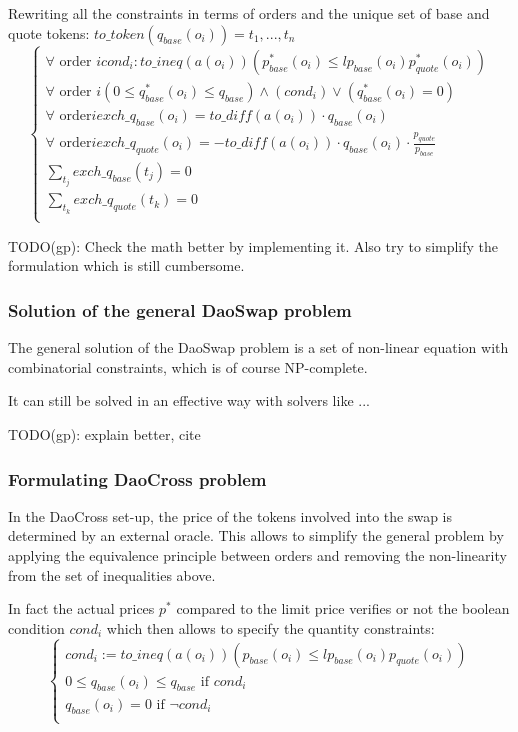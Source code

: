 \documentclass[11pt, reqno]{amsart}
\begin{document}
Rewriting all the constraints in terms of orders and the unique set of base and quote tokens:
$\mathit{to\_token}(q_{base}(o_i)) = t_1, ..., t_n$
\begin{equation}
  \begin{cases}
    \forall \text{ order } i cond_i: \mathit{to\_ineq}(a(o_i))(p^*_{base}(o_i) \leq lp_{base}(o_i) p^*_{quote}(o_i)) \\
    \forall \text{ order } i (0 \le q^*_{base}(o_i) \le q_{base}) \land (cond_i) \lor (q^*_{base}(o_i) = 0) \\
    \forall \text{ order} i exch\_q_{base}(o_i) = \mathit{to\_diff}(a(o_i)) \cdot q_{base}(o_i) \\
    \forall \text{ order} i exch\_q_{quote}(o_i) = - \mathit{to\_diff}(a(o_i)) \cdot q_{base}(o_i) \cdot \frac{p_{quote}}{p_{base}} \\
    \sum_{t_j} exch\_q_{base}(t_j) = 0 \\
    \sum_{t_k} exch\_q_{quote}(t_k) = 0 \\
  \end{cases}
\end{equation}

TODO(gp): Check the math better by implementing it. Also try to simplify the
formulation which is still cumbersome.

\subsubsection{Solution of the general DaoSwap problem}

The general solution of the DaoSwap problem is a set of non-linear equation with 
combinatorial constraints, which is of course NP-complete.

It can still be solved in an effective way with solvers like ...

TODO(gp): explain better, cite

\subsubsection{Formulating DaoCross problem}
In the DaoCross set-up, the price of the tokens involved into the swap is
determined by an external oracle.
This allows to simplify the general problem by applying the equivalence
principle between orders and removing the non-linearity from the set of
inequalities above.

In fact the actual prices $p^*$ compared to the limit price verifies or not the
boolean condition $cond_i$ which then allows to specify the quantity
constraints:
\begin{equation}
  \begin{cases}
    cond_i := \mathit{to\_ineq}(a(o_i))(p_{base}(o_i) \leq lp_{base}(o_i) p_{quote}(o_i)) \\
    0 \le q_{base}(o_i) \le q_{base} \text{ if } cond_i \\
    q_{base}(o_i) = 0 \text{ if } \lnot cond_i \\
  \end{cases}
\end{equation}
\end{document}
